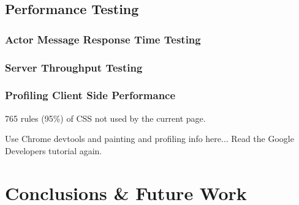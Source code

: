 \documentclass{l4proj}
\begin{document}
    

\section{Performance Testing}

    \subsection{Actor Message Response Time Testing}

    \subsection{Server Throughput Testing}

    \subsection{Profiling Client Side Performance}
    
    
    765 rules (95\%) of CSS not used by the current page.
    
    Use Chrome devtools and painting and profiling info here... Read the Google Developers tutorial again.
        
    
    



\chapter{Conclusions \& Future Work}

    

    
\end{document}
